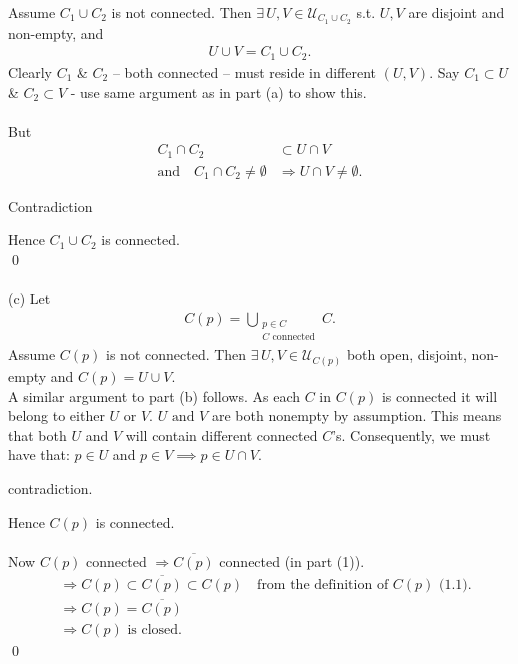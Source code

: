 \documentclass[12pt]{article}
\begin{document}
\noindent Assume $C_1\cup C_2$ is not connected. Then
$\exists\,U,V\in\mathcal{U}_{C_1\cup C_2}$ s.t. $U,V$ are disjoint and non-empty,
and
\begin{align*}
U\cup V = C_1\cup C_2.
\end{align*}
Clearly $C_1$ \& $C_2$ -- both connected -- must reside in different
$(U,V)$. Say $C_1\subset U$ \& $C_2\subset V$ - use same argument as in part (a) to show this.\\
\\
But
\begin{align*}
C_1\cap C_2 &\subset U\cap V\\
\text{and}\quad C_1\cap C_2\neq\emptyset
&\Rightarrow U\cap V\neq\emptyset.
\end{align*}
\begin{center}
Contradiction
\end{center}
Hence $C_1\cup C_2$ is connected.\\
\qed\\
\\
(c) \noindent Let
\begin{align*}
C(p)=\bigcup_{\substack{p\in C\\C\text{ connected}}}C.
\end{align*}
Assume $C(p)$ is not connected. Then $\exists\,U,V\in\mathcal{U}_{C(p)}$ both open,
disjoint, non-empty and $C(p) =U\cup V$.\\
A similar argument to part (b) follows. As each $C$ in $C(p)$
is connected it will belong to either $U$ or $V$.  $U \text{ and } V$ are both nonempty by assumption.  
This means that both $U$ and $V$ will contain different connected $C$'s.
Consequently, we must have that: $p \in U$ and $p \in V \implies p \in U \cap V$.
\begin{center}
contradiction.
\end{center}
Hence $C(p)$ is connected.\\
\\
\noindent Now $C(p)$ connected $\Rightarrow\overline{C(p)}$ connected (in part (1)).
\begin{align*}
&\Rightarrow C(p)\subset\overline{C(p)}\subset C(p)
\quad\text{from the definition of $C(p)$ (1.1).}\\
&\Rightarrow C(p)=\overline{C(p)}\\
&\Rightarrow C(p)\text{ is closed.}
\end{align*}
\qed
\end{document}
